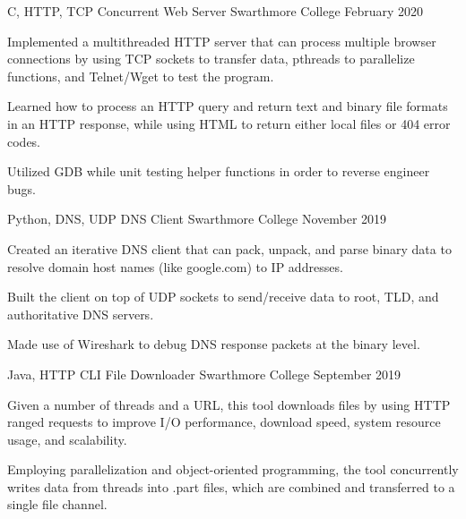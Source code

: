 

\begin{cventries}

  \cventry
    {C, HTTP, TCP} %
    {Concurrent Web Server} %
    {Swarthmore College} %
    {February 2020} %
    {
      \begin{cvitems} %
        \item {Implemented a multithreaded HTTP server that can process multiple browser connections by using TCP sockets to transfer data, pthreads to parallelize functions, and Telnet/Wget to test the program.}
        \item {Learned how to process an HTTP query and return text and binary file formats in an HTTP response, while using HTML to return either local files or 404 error codes.} 
        \item{Utilized GDB while unit testing helper functions in order to reverse engineer bugs.}
      \end{cvitems}
    }

  \cventry
    {Python, DNS, UDP} %
    {DNS Client} %
    {Swarthmore College} %
    {November 2019} %
    {
      \begin{cvitems} %
        \item {Created an iterative DNS client that can pack, unpack, and parse binary data to resolve domain host names (like google.com) to IP addresses.}
        \item {Built the client on top of UDP sockets to send/receive data to root, TLD, and authoritative DNS servers.}
        \item{Made use of Wireshark to debug DNS response packets at the binary level.}
      \end{cvitems}
    }
  \cventry
    {Java, HTTP} %
    {CLI File Downloader} %
    {Swarthmore College} %
    {September 2019} %
    {
      \begin{cvitems} %
        \item {Given a number of threads and a URL, this tool downloads files by using HTTP ranged requests to improve I/O performance, download speed, system resource usage, and scalability.}
        \item {Employing parallelization and object-oriented programming, the tool concurrently writes data from threads into .part files, which are combined and transferred to a single file channel.}
      \end{cvitems}
    }

\end{cventries}